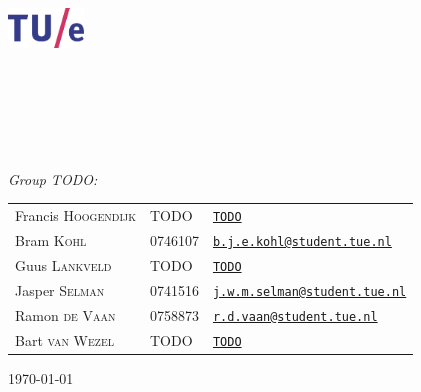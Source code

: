 \begin{titlepage}
	\begin{center}

		\includegraphics[width=0.15\textwidth]{Images/tuelogo}\\[1cm]

		\textsc{\LARGE \uni}\\[0.2cm]

		\textsc{\fase}\\[1.6cm]

        \textsc{\LARGE \vak}\\[0.5cm]

\HRule \\[0.4cm]
{ \huge \bfseries \essaytitle}\\[0.4cm]

\HRule \\[1.5cm]

	\emph{Group TODO:}\\
    \begin{tabular}{l l l}
	Francis \textsc{Hoogendijk} & TODO & \href{mailto:TODO}{\texttt{TODO}}\\
	Bram \textsc{Kohl} & 0746107 & \href{mailto:b.j.e.kohl@student.tue.nl}{\texttt{b.j.e.kohl@student.tue.nl}}\\
	Guus \textsc{Lankveld} & TODO & \href{mailto:TODO}{\texttt{TODO}}\\
	Jasper \textsc{Selman} & 0741516 & \href{mailto:j.w.m.selman@student.tue.nl}{\texttt{j.w.m.selman@student.tue.nl}}\\
	Ramon \textsc{de Vaan} & 0758873 & \href{mailto:r.d.vaan@student.tue.nl}{\texttt{r.d.vaan@student.tue.nl}}\\
	Bart \textsc{van Wezel} & TODO & \href{mailto:r.d.vaan@student.tue.nl}{\texttt{TODO}}
    \end{tabular}
		\vfill

		{\large \today} \\
		\stad

	\end{center}
\end{titlepage} 
